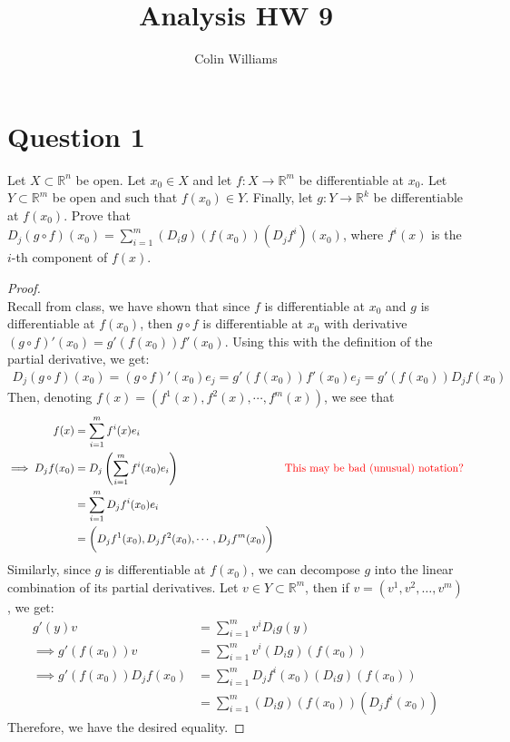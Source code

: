 \documentclass[10pt,a4paper]{article}
\title{Analysis HW 9}
\author{Colin Williams}
\theoremstyle{definition}
\theoremstyle{definition}
\numberwithin{equation}{section}
\begin{document}
\maketitle


\section*{Question 1}
Let $X \subset \mathbb{R}^n$ be open. Let $x_0 \in X$ and let $f: X \to \mathbb{R}^m$ be differentiable at $x_0$. Let $Y \subset \mathbb{R}^m$ be open and such that $f(x_0) \in Y$. Finally, let $g: Y \to \mathbb{R}^k$ be differentiable at $f(x_0)$. Prove that $D_j(g \circ f)(x_0) = \sum_{i = 1}^m (D_i g)(f(x_0))(D_j f^i)(x_0)$, where $f^i(x)$ is the $i$-th component of $f(x)$. 

\begin{proof}$ $
\\Recall from class, we have shown that since $f$ is differentiable at $x_0$ and $g$ is differentiable at $f(x_0)$, then $g \circ f$ is differentiable at $x_0$ with derivative $(g \circ f)'(x_0) = g'(f(x_0))f'(x_0)$. Using this with the definition of the partial derivative, we get:
\begin{align*}
D_j(g \circ f)(x_0) = (g \circ f)'(x_0) e_j = g'(f(x_0))f'(x_0) e_j = g'(f(x_0)) D_jf(x_0)
\end{align*}
Then, denoting $f(x) = (f^1(x), f^2(x), \cdots, f^m(x))$, we see that 
\begin{align*}
f(x) &= \sum_{i = 1}^m f^i(x) e_i\\
\implies D_jf(x_0) &= D_j \left( \sum_{i = 1}^m f^i(x_0) e_i \right) &\text{\color{red} This may be bad (unusual) notation?}\\
&= \sum_{i = 1}^m D_j f^i(x_0) e_i\\
&= \bigg( D_j f^1(x_0), D_j f^2(x_0), \cdots, D_j f^m(x_0) \bigg)
\end{align*}
Similarly, since $g$ is differentiable at $f(x_0)$, we can decompose $g$ into the linear combination of its partial derivatives. Let $v \in Y \subset \mathbb{R}^m$, then if $v = (v^1, v^2, \ldots, v^m)$, we get:
\begin{align*}
g'(y)v &= \sum_{i = 1}^m v^i D_i g(y)\\
\implies g'(f(x_0))v &= \sum_{i = 1}^m v^i (D_i g)(f(x_0))\\
\implies g'(f(x_0)) D_jf(x_0) &= \sum_{i = 1}^m D_j f^i(x_0) (D_i g)(f(x_0))\\
&= \sum_{i = 1}^m (D_i g)(f(x_0)) (D_j f^i (x_0))
\end{align*}
Therefore, we have the desired equality. 
\end{proof}
\end{document}
